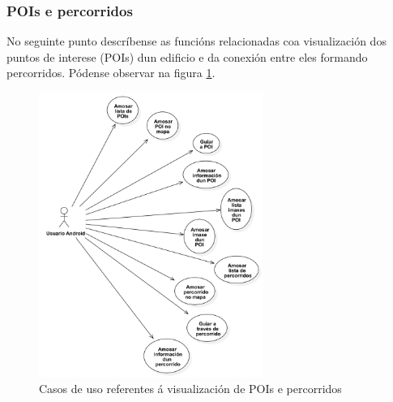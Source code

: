 \subsubsection{POIs e percorridos}
No seguinte punto descríbense as funcións relacionadas coa visualización dos puntos de interese (POIs) dun edificio e da conexión entre eles formando percorridos. Pódense observar na figura \ref{fig:cuUsuarioAndroidPrincipalPOIPercorrido}.

\begin{figure}[tbp]
	\begin{center}
		\includegraphics[width=0.65\textwidth]{figures/CasosUso/UsuarioAndroidPOIPercorrido}
		\caption{Casos de uso referentes á visualización de POIs e percorridos}
		\label{fig:cuUsuarioAndroidPrincipalPOIPercorrido}
	\end{center}
\end{figure}

